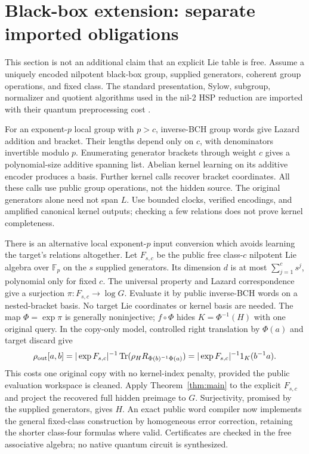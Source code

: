 \documentclass[11pt]{article}
\theoremstyle{remark}
\begin{document}
\section{Black-box extension: separate imported obligations}
This section is not an additional claim that an explicit Lie table is free.
Assume a uniquely encoded nilpotent black-box group, supplied generators,
coherent group operations, and fixed class. The standard presentation,
Sylow, subgroup, normalizer and quotient algorithms used in the nil-2 HSP
reduction are imported with their quantum preprocessing cost \cite{iss}.

For an exponent-$p$ local group with $p>c$, inverse-BCH group words give
Lazard addition and bracket. Their lengths depend only on $c$, with
denominators invertible modulo $p$. Enumerating generator brackets through
weight $c$ gives a polynomial-size additive spanning list. Abelian kernel
learning on its additive encoder produces a basis. Further kernel calls
recover bracket coordinates. All these calls use public group operations,
not the hidden source. The original generators alone need not span $L$.
Use bounded clocks, verified encodings, and amplified canonical kernel
outputs; checking a few relations does not prove kernel completeness.

There is an alternative local exponent-$p$ input conversion which avoids
learning the target's relations altogether. Let $F_{s,c}$ be the public
free class-$c$ nilpotent Lie algebra over $\mathbb F_p$ on the $s$ supplied
generators. Its dimension $d$ is at most $\sum_{j=1}^c s^j$, polynomial
only for fixed $c$. The universal property and Lazard correspondence give
a surjection $\pi:F_{s,c}\to\log G$. Evaluate it by public inverse-BCH
words on a nested-bracket basis. No target Lie coordinates or kernel
basis are needed. The map $\Phi=\exp\pi$ is generally noninjective;
$f\circ\Phi$ hides $K=\Phi^{-1}(H)$ with one original query. In the
copy-only model, controlled right translation by $\Phi(a)$ and target
discard give
\[
 \rho_{\rm out}[a,b]=|\exp F_{s,c}|^{-1}
  \operatorname{Tr}(\rho_H R_{\Phi(b)^{-1}\Phi(a)})
  =|\exp F_{s,c}|^{-1}1_K(b^{-1}a).
\]
This costs one original copy with no kernel-index penalty, provided the
public evaluation workspace is cleaned. Apply Theorem~\ref{thm:main}
to the explicit $F_{s,c}$ and project the recovered full hidden preimage
to $G$. Surjectivity, promised by the supplied generators, gives $H$.
An exact public word compiler now implements the general fixed-class
construction by homogeneous error correction, retaining the shorter
class-four formulas where valid. Certificates are checked in the free
associative algebra; no native quantum circuit is synthesized.
\end{document}
